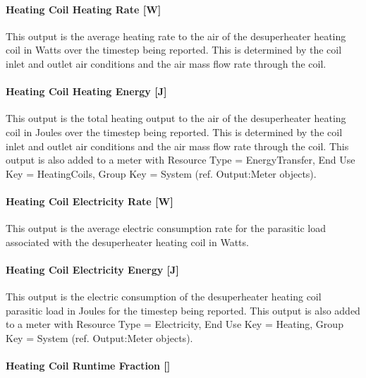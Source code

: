 \paragraph{Heating Coil Heating Rate {[}W{]}}\label{heating-coil-heating-rate-w-3}

This output is the average heating rate to the air of the desuperheater heating coil in Watts over the timestep being reported. This is determined by the coil inlet and outlet air conditions and the air mass flow rate through the coil.

\paragraph{Heating Coil Heating Energy {[}J{]}}\label{heating-coil-heating-energy-j-3}

This output is the total heating output to the air of the desuperheater heating coil in Joules over the timestep being reported. This is determined by the coil inlet and outlet air conditions and the air mass flow rate through the coil. This output is also added to a meter with Resource Type = EnergyTransfer, End Use Key = HeatingCoils, Group Key = System (ref. Output:Meter objects).

\paragraph{Heating Coil Electricity Rate {[}W{]}}\label{heating-coil-electric-power-w-2}

This output is the average electric consumption rate for the parasitic load associated with the desuperheater heating coil in Watts.

\paragraph{Heating Coil Electricity Energy {[}J{]}}\label{heating-coil-electric-energy-j-1}

This output is the electric consumption of the desuperheater heating coil parasitic load in Joules for the timestep being reported. This output is also added to a meter with Resource Type = Electricity, End Use Key = Heating, Group Key = System (ref. Output:Meter objects).

\paragraph{Heating Coil Runtime Fraction {[]}}\label{heating-coil-runtime-fraction}

